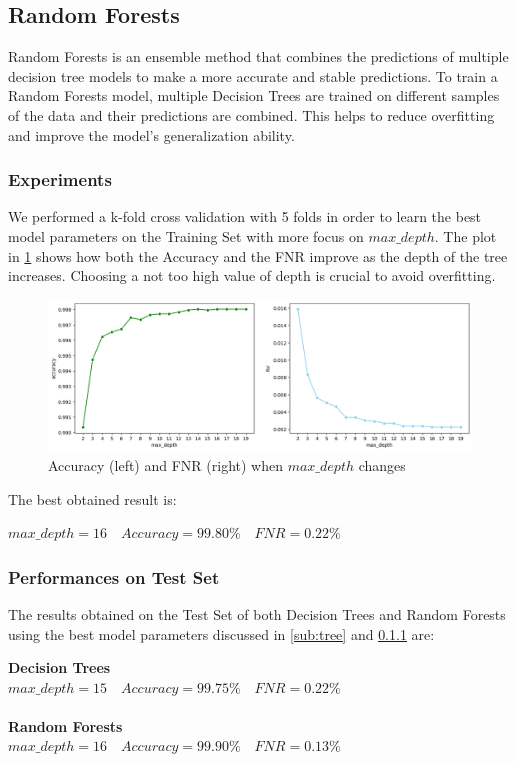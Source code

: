\documentclass[twocolumn, switch]{article} %
\newcommand\x{0.7}
\begin{document}
\subsection{Random Forests}
Random Forests is an ensemble method that combines the predictions of multiple decision tree models to make a more accurate and stable predictions.
To train a Random Forests model, multiple Decision Trees are trained on different samples of the data and their predictions are combined. This helps to reduce overfitting and improve the model's generalization ability.

\subsubsection{Experiments}
\label{sub:randomforest}
We performed a k-fold cross validation with 5 folds in order to learn the best model parameters on the Training Set with more focus on $max\_depth$. The plot in \ref{fig:foresttrain} shows how both the Accuracy and the FNR improve as the depth of the tree increases. Choosing a not too high value of depth is crucial to avoid overfitting.

\begin{figure}[ht!]
	\centering
	\includegraphics[width=\x\linewidth]{randomforest_accuracy_fnr.png}
	\caption{Accuracy (left) and FNR (right) when $max\_depth$ changes}
	\label{fig:foresttrain}
\end{figure}
The best obtained result is:
\begin{center}
	$max\_depth=16 \quad Accuracy=99.80\% \quad FNR=0.22\%$
\end{center}

\subsubsection{Performances on Test Set}
The results obtained on the Test Set of both Decision Trees and Random Forests using the best model parameters discussed in \ref{sub:tree} and \ref{sub:randomforest} are:
\begin{center}
	\textbf{Decision Trees}\\
	$max\_depth=15 \quad Accuracy=99.75\% \quad FNR=0.22\%$\\~\\
	\textbf{Random Forests}\\
	$max\_depth=16 \quad Accuracy=99.90\% \quad FNR=0.13\%$
\end{center}
\end{document}
